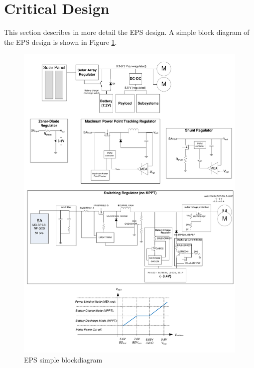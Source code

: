 \newpage
\section{Critical Design}
\label{sec:critical_design}
%
This section describes in more detail the \ac{EPS} design. A simple block diagram of the \ac{EPS} design is shown in Figure \ref{fig:EPS_diagram_simple}.

\begin{figure}[H]
\centering
\includegraphics[width=\textwidth]{figures/fig_PDR_EPSdiagram}
\caption{\ac{EPS} simple blockdiagram}
\label{fig:EPS_diagram_simple}
\end{figure}
%
%
